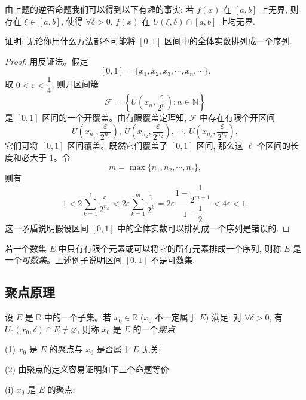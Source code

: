 \begin{remark}\label{remark:ma-2-source-75}
由上题的逆否命题我们可以得到以下有趣的事实: 若 $f(x)$ 在 $[a,b]$ 上无界, 则存在 $\xi\in[a,b]$, 使得 $\forall\delta>0$, $f(x)$ 在 $U(\xi,\delta)\cap[a,b]$ 上均无界.
\end{remark}


\begin{example}\label{example:ma-2-4-3}
证明: 无论你用什么方法都不可能将 $[0,1]$ 区间中的全体实数排列成一个序列.
\end{example}


\begin{proof}
用反证法。假定
\[
  [0,1]=\{x_1,x_2,x_3,\cdots,x_n,\cdots\}.
\]
取 $0<\varepsilon<\dfrac14$, 则开区间簇
\[
  \mathcal{F}=\left\{U\left(x_n,\frac{\varepsilon}{2^n}\right):n\in\mathbb{N}\right\}
\]
是 $[0,1]$ 区间的一个开覆盖。由有限覆盖定理知, $\mathcal{F}$ 中存在有限个开区间
\[
  U\left(x_{n_1},\frac{\varepsilon}{2^{n_1}}\right),\
  U\left(x_{n_2},\frac{\varepsilon}{2^{n_2}}\right),\
  \cdots,\
  U\left(x_{n_\ell},\frac{\varepsilon}{2^{n_\ell}}\right),
\]
它们可将 $[0,1]$ 区间覆盖。既然它们覆盖了 $[0,1]$ 区间, 那么这 $\ell$ 个区间的长度和必大于 $1$。令
\[
  m=\max\{n_1,n_2,\cdots,n_\ell\},
\]
则有
\[
  1<
  2\sum_{k=1}^{\ell}\frac{\varepsilon}{2^{n_k}}
  <
  2\varepsilon\sum_{k=1}^m\frac1{2^k}
  =
  2\varepsilon\frac{1-\dfrac1{2^{m+1}}}{1-\dfrac12}
  <
  4\varepsilon<1.
\]
这一矛盾说明假设区间 $[0,1]$ 中的全体实数可以排列成一个序列是错误的.
\end{proof}


\begin{remark}\label{remark:ma-2-source-78}
若一个数集 $E$ 中只有有限个元素或可以将它的所有元素排成一个序列, 则称 $E$ 是一个\emph{可数集}。上述例子说明区间 $[0,1]$ 不是可数集.
\end{remark}


\subsection{聚点原理}
\label{subsec:ma-2-4-3}

\begin{definition}\label{definition:ma-2-4-1}
设 $E$ 是 $\mathbb{R}$ 中的一个子集。若 $x_0\in\mathbb{R}$ ($x_0$ 不一定属于 $E$) 满足: 对 $\forall\delta>0$, 有 $U_0(x_0,\delta)\cap E\ne\varnothing$, 则称 $x_0$ 是 $E$ 的一个\emph{聚点}.
\end{definition}


\begin{remark}\label{remark:ma-2-source-80}
(1) $x_0$ 是 $E$ 的聚点与 $x_0$ 是否属于 $E$ 无关;

(2) 由聚点的定义容易证明如下三个命题等价:

(i) $x_0$ 是 $E$ 的聚点;
\end{remark}

